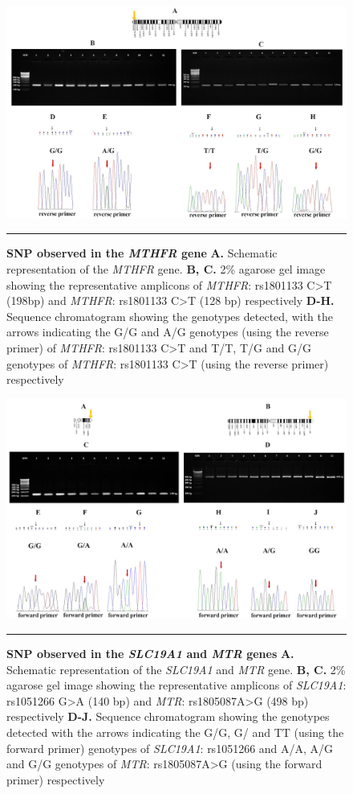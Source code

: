 \begin{refsection}
\begin{figure}
\centering
\includegraphics[scale=0.9,keepaspectratio]{Figures/Figure6_1.pdf}
\rule{35em}{0.5pt}
\caption{\textbf{SNP observed in the \textit{MTHFR} gene}
\textbf{A.} Schematic representation of the \textit{MTHFR} gene. \textbf{B, C.} 2\% agarose gel image showing the representative amplicons of \textit{MTHFR}: rs1801133 C>T (198bp) and \textit{MTHFR}: rs1801133 C>T (128 bp) respectively \textbf{D-H.} Sequence chromatogram showing the genotypes detected, with the arrows indicating the G/G and A/G genotypes (using the reverse primer) of \textit{MTHFR}: rs1801133 C>T and T/T, T/G and G/G genotypes of \textit{MTHFR}: rs1801133 C>T (using the reverse primer) respectively}
\label{fig:6_1}
\end{figure}

\begin{figure}
\centering
\includegraphics[scale=0.9,keepaspectratio]{Figures/Figure6_2.pdf}
\rule{35em}{0.5pt}
\caption{\textbf{SNP observed in the \textit{SLC19A1} and \textit{MTR} genes}
\textbf{A.} Schematic representation of the \textit{SLC19A1} and \textit{MTR} gene. \textbf{B, C.} 2\% agarose gel image showing the representative amplicons of \textit{SLC19A1}:  rs1051266 G>A (140 bp) and \textit{MTR}: rs1805087A>G (498 bp) respectively \textbf{D-J.} Sequence chromatogram showing the genotypes detected with the arrows indicating the G/G, G/ and TT (using the forward primer) genotypes of \textit{SLC19A1}:  rs1051266  and A/A, A/G and G/G genotypes of \textit{MTR}: rs1805087A>G (using the forward primer) respectively}
\label{fig:6_2}
\end{figure}


\end{refsection}
